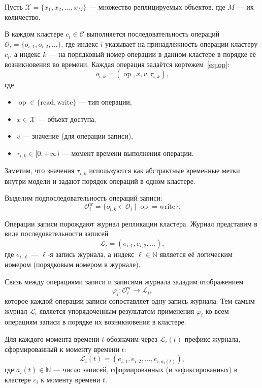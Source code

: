 Пусть
$\mathcal{X} = \{x_1, x_2, \dots, x_M\}$
--- множество реплицируемых объектов, где $M$ --- их количество.

В каждом кластере $c_i\in\mathcal{C}$ выполняется последовательность операций
$\mathcal{O}_i = \{o_{i,1}, o_{i,2}, \dots\}$,
где индекс $i$ указывает на принадлежность операции кластеру $c_i$,
а индекс $k$ --- на порядковый номер операции в данном кластере
в порядке её возникновения во времени.
Каждая операция задаётся кортежем~\ref{eq:op}:
\begin{equation}
o_{i,k} = (\operatorname{op}, x, v, \tau_{i,k}),
\label{eq:op}
\end{equation}
где
\begin{itemize}
\item $\operatorname{op} \in \{\mathrm{read}, \mathrm{write}\}$ --- тип операции,
\item $x \in \mathcal{X}$ --- объект доступа,
\item $v$ --- значение (для операции записи),
\item $\tau_{i,k} \in [0,+\infty)$ --- момент времени выполнения операции.
\end{itemize}

Заметим, что значения $\tau_{i,k}$ используются как абстрактные временные метки
внутри модели и задают порядок операций в одном кластере.

Выделим подпоследовательность операций записи:
\[
\mathcal{O}_i^{\mathrm{w}}=\{o_{i,k}\in\mathcal{O}_i \mid \operatorname{op}=\mathrm{write}\}.
\]

Операции записи порождают журнал репликации кластера.
Журнал представим в виде последовательности записей
\begin{equation}
\mathcal{L}_i = (e_{i,1}, e_{i,2}, \dots),
\label{eq:Li}
\end{equation}
где $e_{i,\ell}$ --- $\ell$-я запись журнала, а индекс $\ell \in \mathbb{N}$
является её логическим номером (порядковым номером в журнале).

Связь между операциями записи и записями журнала зададим отображением
\begin{equation}
\varphi_i:\mathcal{O}_i^{\mathrm{w}} \to \mathcal{L}_i,
\label{eq:phi_i}
\end{equation}
которое каждой операции записи сопоставляет одну запись журнала.
Тем самым журнал $\mathcal{L}_i$ является упорядоченным результатом применения
$\varphi_i$ ко всем операциям записи в порядке их возникновения в кластере.

Для каждого момента времени $t$ обозначим через $\mathcal{L}_i(t)$ префикс журнала,
сформированный к моменту времени $t$:
\[
\mathcal{L}_i(t) = (e_{i,1}, e_{i,2}, \dots, e_{i,a_i(t)}),
\]
где $a_i(t)\in\mathbb{N}$ --- число записей, сформированных (и зафиксированных)
в кластере $c_i$ к моменту времени $t$.


